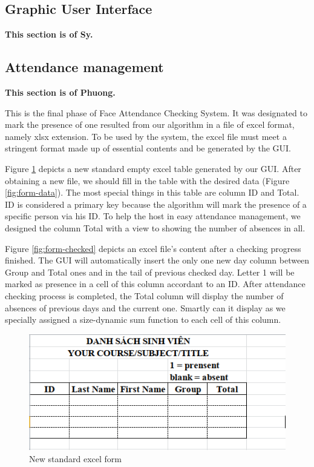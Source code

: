 \documentclass[journal, twocolumn]{IEEEtran}
\begin{document}
\subsection{Graphic User Interface}
\label{gui}
\textbf{This section is of Sy.}


\subsection{Attendance management}
\label{attendance-management}
\textbf{This section is of Phuong.}

This is the final phase of Face Attendance Checking System.
It was designated to mark the presence of one resulted from
our algorithm in a file of excel format, namely xlsx extension.
To be used by the system, the excel file must meet
a stringent format made up of essential contents and be
generated by the GUI. 

Figure \ref{fig:form-new} depicts a new standard empty
excel table generated by our GUI. After obtaining a new file, we should fill in the table with the desired data (Figure \ref{fig:form-data}). The most special things in this table are column ID and Total. 
ID is considered a primary key because the algorithm will mark the presence of a specific person via his ID. 
To help the host in easy attendance management, we designed the column Total with a view to showing the number of absences in all.

Figure \ref{fig:form-checked} depicts an excel file's content after a checking progress finished. 
The GUI will automatically insert the only one new day column between Group and Total ones and in the tail of previous checked day. 
Letter 1 will be marked as presence in a cell of this column accordant to an ID. 
After attendance checking process is completed, the Total column will display the number of absences of previous days and the current one. Smartly can it display as we specially assigned a size-dynamic sum function to each cell of this column.


\begin{figure}
    \centering
    \includegraphics[width=0.8\linewidth]{img/form-new.png}
	\caption{New standard excel form}\label{fig:form-new}
\end{figure}
\end{document}
